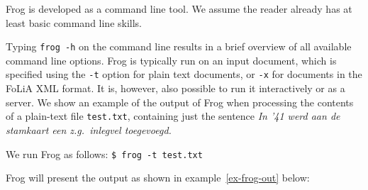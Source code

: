 \documentclass{book}
\begin{document}
Frog is developed as a command line tool. We assume the reader already has at
least basic command line skills.

Typing {\tt frog -h} on the command
line results in a brief overview of all available command line options. Frog is
typically run on an input document, which is specified using the {\tt -t} option for
plain text documents, or {\tt -x} for documents in the FoLiA XML format. It is,
however, also possible to run it interactively or as a server.
We show an example of the output of Frog when processing the contents of a
plain-text file \texttt{test.txt}, containing just the sentence {\it In '41 werd aan de stamkaart een
z.g.\ inlegvel toegevoegd.}

We run Frog as follows: {\tt \$ frog -t test.txt }

Frog will present the output as shown in example~\ref{ex-frog-out} below:

\begin{example}
\label{ex-frog-out}
\end{example}
\end{document}
